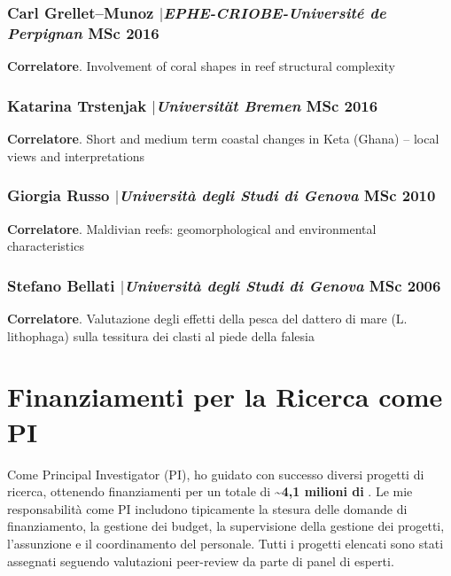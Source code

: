\documentclass[11pt]{article}
\begin{document}
\smallskip

\subsubsection{Carl Grellet–Munoz $|${\normalfont\textit{EPHE-CRIOBE-Université de Perpignan}} \hfill MSc 2016}
{\footnotesize 
\textbf{Correlatore}. Involvement of coral shapes in reef structural complexity}

\smallskip

\subsubsection{Katarina Trstenjak $|${\normalfont\textit{Universität Bremen}} \hfill MSc 2016}
{\footnotesize 
\textbf{Correlatore}. Short and medium term coastal changes in Keta (Ghana) – local views and interpretations}

\smallskip

\subsubsection{Giorgia Russo $|${\normalfont\textit{Università degli Studi di Genova}} \hfill MSc 2010}
{\footnotesize 
\textbf{Correlatore}. Maldivian reefs: geomorphological and environmental characteristics}
\smallskip

\subsubsection{Stefano Bellati $|${\normalfont\textit{Università degli Studi di Genova}} \hfill MSc 2006}
{\footnotesize 
\textbf{Correlatore}. Valutazione degli effetti della pesca del dattero di mare (L. lithophaga) sulla tessitura dei clasti al piede della falesia}

	
\newpage
\section{Finanziamenti per la Ricerca come PI}
{\normalfont Come Principal Investigator (PI), ho guidato con successo diversi progetti di ricerca, ottenendo finanziamenti per un totale di \textbf{\textasciitilde4,1 milioni di \texteuro}. Le mie responsabilità come PI includono tipicamente la stesura delle domande di finanziamento, la gestione dei budget, la supervisione della gestione dei progetti, l'assunzione e il coordinamento del personale. Tutti i progetti elencati sono stati assegnati seguendo valutazioni peer-review da parte di panel di esperti.}\\
\end{document}
